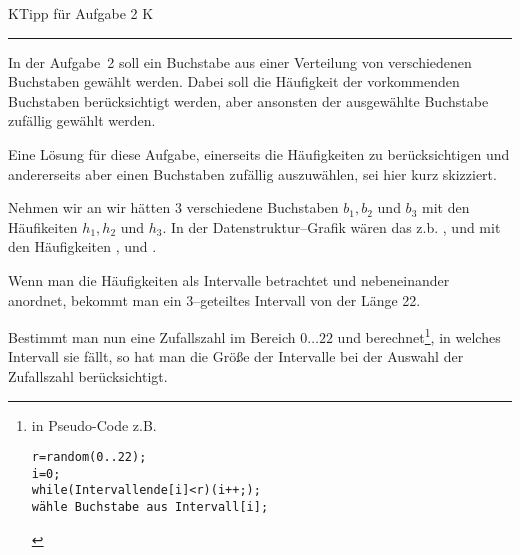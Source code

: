\documentclass[paper=a4,notitlepage,parskip=half,plainheadsepline,12pt]{scrartcl}
\begin{document}
\begin{center}
{\lf K}\hfill {\LARGE Tipp für Aufgabe 2} \hfill {\lf K}\\
\rule{\textwidth}{2pt}
\end{center}

In der Aufgabe~2 soll ein Buchstabe aus einer Verteilung von verschiedenen Buchstaben gewählt werden.
Dabei soll die Häufigkeit der vorkommenden Buchstaben berücksichtigt werden, aber ansonsten der ausgewählte Buchstabe zufällig gewählt werden.

Eine Lösung für diese Aufgabe, einerseits die Häufigkeiten zu berücksichtigen und andererseits aber einen Buchstaben zufällig auszuwählen, sei hier kurz skizziert.

Nehmen wir an wir hätten 3 verschiedene Buchstaben $b_1, b_2$ und $b_3$ mit den Häufikeiten $h_1, h_2$ und $h_3$.
In der Datenstruktur--Grafik wären das z.b. ,  und  mit den Häufigkeiten ,  und . 

\begin{center}
\end{center}

Wenn man die Häufigkeiten als Intervalle betrachtet und nebeneinander anordnet, bekommt man ein 3--geteiltes Intervall von der Länge 22.

\begin{center}
\end{center}

Bestimmt man nun eine Zufallszahl im Bereich $0\dots 22$ und berechnet\footnote{in Pseudo-Code z.B.
\begin{verbatim} 
r=random(0..22);
i=0;
while(Intervallende[i]<r)(i++;);
wähle Buchstabe aus Intervall[i];
\end{verbatim}
}, in welches Intervall sie fällt, so hat man die Größe der Intervalle bei der Auswahl der Zufallszahl berücksichtigt. 
\end{document}
